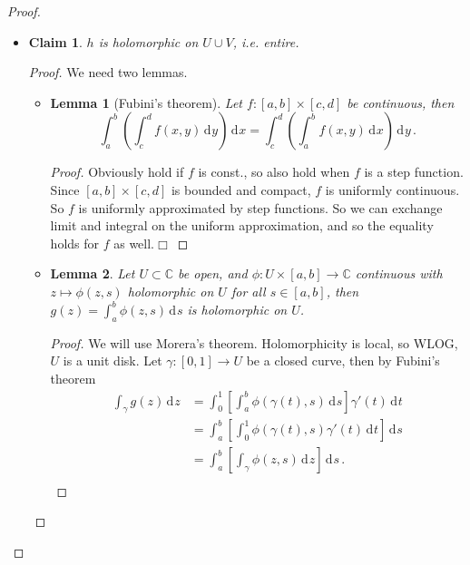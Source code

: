 \documentclass{article}
\theoremstyle{plain}\theoremheaderfont{\normalfont\itshape}\theorembodyfont{\rmfamily}\theoremseparator{.}\newtheorem*{rem}{Remark}\newtheorem*{ex}{Example}\newtheorem*{proof}{Proof}\newtheorem*{altp}{Alternative proof}\newtheorem*{con}{Consequences}\newtheorem*{notn}{Notations}\newtheorem*{cau}{Caution}\newtheorem*{term}{Terminology}\newtheorem*{keyex}{Key example}
\theoremstyle{plain}\theoremheaderfont{\normalfont\bfseries}\theorembodyfont{\rmfamily}\theoremseparator{.}\newtheorem{thm}{Theorem}[section]\newtheorem{lem}[thm]{Lemma}\newtheorem{prop}[thm]{Proposition}\newtheorem*{cor}{Corollary}\newtheorem{defn}[thm]{Definition}\newtheorem{clm}[thm]{Claim}\newtheorem{clminproof}{Claim}\newtheorem{leminproof}{Lemma}\newtheorem{app}{Application}
\theoremstyle{break}\theoremheaderfont{\normalfont\itshape}\theorembodyfont{\rmfamily}\theoremseparator{.\medskip}\newtheorem*{proofskip}{Proof}\newtheorem*{exs}{Examples}\newtheorem*{rems}{Remarks}\newtheorem*{rec}{Recall}\newtheorem*{ppts}{Properties}
\theoremstyle{break}\theoremheaderfont{\normalfont\bfseries}\theorembodyfont{\rmfamily}\theoremseparator{.\medskip}\newtheorem{lemskip}[thm]{Lemma}\newtheorem{defnskip}[thm]{Definition}\newtheorem{propskip}[thm]{Proposition}\newtheorem{thmskip}[thm]{Theorem}
\numberwithin{equation}{section}
\newcommand{\qed}{\hfill\ensuremath{\Box}}
\newcommand{\dd}[2][]{\,\mathrm{d}^{#1} #2}
\newcommand{\CC}{\mathbb{C}}
\begin{document}
\begin{proof}
\begin{itemize}[parsep=1em,rightmargin=30pt]
            \item \begin{clminproof}
                \(h\) is holomorphic on \(U\cup V\), i.e. entire.
            \end{clminproof}
            \begin{proof}
                We need two lemmas.
                \begin{itemize}[parsep=1em,rightmargin=30pt]
                    \item \begin{leminproof}[Fubini's theorem]
                        Let \(f:[a,b]\times[c,d]\) be continuous, then
                        \[\int_a^b\left(\int_c^df(x,y)\dd{y}\right)\dd{x}=\int_{c}^{d}\left(\int_{a}^{b}f(x,y)\dd{x}\right)\dd{y}\,.\]
                    \end{leminproof}
                    \begin{proof}
                        Obviously hold if \(f\) is const., so also hold when \(f\) is a step function. Since \([a,b]\times[c,d]\) is bounded and compact, \(f\) is uniformly continuous. So \(f\) is uniformly approximated by step functions. So we can exchange limit and integral on the uniform approximation, and so the equality holds for \(f\) as well.\qed
                    \end{proof}
                    \item \begin{leminproof}
                        Let \(U\subset\CC\) be open, and \(\phi:U\times[a,b]\to\CC\) continuous with \(z\mapsto\phi(z,s)\) holomorphic on \(U\) for all \(s\in[a,b]\), then \(g(z)=\int_{a}^{b}\phi(z,s)\dd{s}\) is holomorphic on \(U\).
                    \end{leminproof}
                    \begin{proof}
                        We will use Morera's theorem. Holomorphicity is local, so WLOG, \(U\) is a unit disk. Let \(\gamma:[0,1]\to U\) be a closed curve, then by Fubini's theorem
                        \begin{align*}
                            \int_{\gamma}g(z)\dd{z}&=\int_{0}^{1}\left[\int_{a}^{b}\phi(\gamma(t),s)\dd{s}\right]\gamma'(t)\dd{t}\\
                            &=\int_{a}^{b}\left[\int_{0}^{1}\phi(\gamma(t),s)\gamma'(t)\dd{t}\right]\dd{s}\\
                            &=\int_{a}^{b}\left[\int_\gamma\phi(z,s)\dd{z}\right]\dd{s}\,.\\

\end{align*}
\end{proof}
\end{itemize}
\end{proof}
\end{itemize}
\end{proof}
\end{document}
